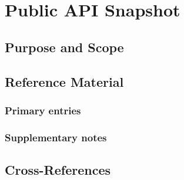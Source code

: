 \chapter{Public API Snapshot}
\label{app:api_snapshot}


\section{Purpose and Scope}
\label{sec:app_api_snapshot:purpose}

\section{Reference Material}
\label{sec:app_api_snapshot:reference}

\subsection{Primary entries}
\label{ssec:app_api_snapshot:primary}

\subsection{Supplementary notes}
\label{ssec:app_api_snapshot:supplementary}

\section{Cross-References}
\label{sec:app_api_snapshot:xref}
